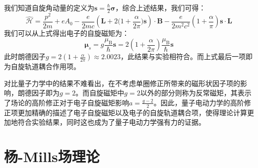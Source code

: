 我们知道自旋角动量的定义为$\boldsymbol{s}=\frac{\hbar}{2}\boldsymbol{\sigma}$，综合上述结果，我们可得：
\begin{equation}
    \hat{\mathcal{H}}=\frac{p^2}{2m}+eA_0-\frac{e}{2mc}\left(\boldsymbol{L}+2\big(1+\frac{\alpha}{2\pi}\big)\boldsymbol{s} \right) \cdot\boldsymbol{B}-\frac{e}{2m^2c^2}\left(1+\frac{\alpha}{\pi}\right)\boldsymbol{s}\cdot\boldsymbol{L}
\end{equation}
我们可以从上式得出电子的自旋磁矩为：
\begin{equation}
    \boldsymbol{\mu}_s=g \frac{\mu_\text{B}}{\hbar}  \boldsymbol{s}=2\left(1+\frac{\alpha}{2\pi}\right)\frac{\mu_\text{B}}{\hbar}  \boldsymbol{s}
\end{equation}
此时朗德因子$g=2\left(1+\frac{\alpha}{2\pi}\right)\approx2.0023$，此结果与实验相符合。而上式最后一项即为自旋轨道耦合作用项。

对比量子力学中的结果不难看出，在不考虑单圈修正所带来的磁形状因子项的影响，朗德因子即为$g=2$。而自旋磁矩中$g=2$以外的部分则称为反常磁矩，其表示了场论的高阶修正对于电子自旋磁矩影响$a=\frac{g-2}{2}$。因此，量子电动力学的高阶修正项更加精确的描述了电子自旋磁矩以及电子的自旋轨道耦合项，使得理论计算更加地符合实验结果，同时这也成为了量子电动力学强有力的证据。


\chapter{杨-Mills场理论}

